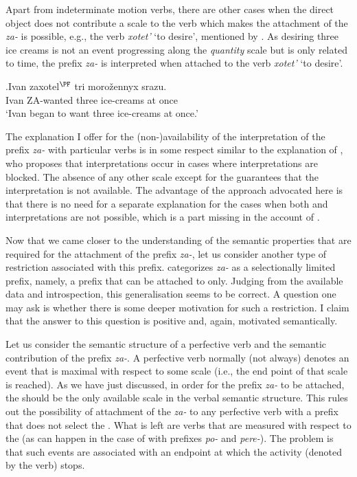 Apart from indeterminate motion verbs, there are other cases when the direct object does not contribute a scale to the verb which makes the attachment of the  \textit{za-} is possible, e.g., the verb \textit{xotet'} `to desire', mentioned by \citet{Braginsky:08}. As desiring three ice creams is not an event progressing along the \textit{quantity} scale but is only related to time, the prefix \textit{za-} is interpreted  when attached to the verb \textit{xotet'} `to desire'.

\exg.\label{ex:zaxotet}Ivan zaxotel$^{\PF}$ tri moro\v{z}ennyx srazu.\\
Ivan ZA-wanted three ice-creams {at once}\\
\trans `Ivan began to want three ice-creams at once.'
\\

The explanation I offer for the (non-)availability of the  interpretation of the prefix \textit{za-} with particular verbs is in some respect similar to the explanation of \citet{Braginsky:08}, who proposes that  interpretations occur in cases where  interpretations are blocked. The absence of any other scale except for the  guarantees that the  interpretation is not available. The advantage of the approach advocated here is that there is no need for a separate explanation for the cases when both  and  interpretations are not possible, which is a part missing in the account of \citet{Braginsky:08}.

Now that we came closer to the understanding of the semantic properties that are required for the attachment of the  prefix \textit{za-}, let us consider another type of restriction associated with this prefix. \citet{Tatevosov:09} categorizes \textit{za-} as a selectionally limited prefix, namely, a prefix that can be attached to  only. Judging from the available data and introspection, this generalisation seems to be correct. A question one may ask is whether there is some deeper motivation for such a restriction. I claim that the answer to this question is positive and, again, motivated semantically. 

Let us consider the semantic structure of a perfective verb and the semantic contribution of the  prefix \textit{za-}. A perfective verb normally (not always) denotes an event that is maximal with respect to some scale (i.e., the end point of that scale is reached). As we have just discussed, in order for the  prefix \textit{za-} to be attached, the  should be the only available scale in the verbal semantic structure. This rules out the possibility of attachment of the  \textit{za-} to any perfective verb with a prefix that does not select the . What is left are verbs that are measured with respect to the  (as can happen in the case of  with prefixes \textit{po-} and \textit{pere-}). The problem is that such events are associated with an endpoint at which the activity (denoted by the  verb) stops. 

